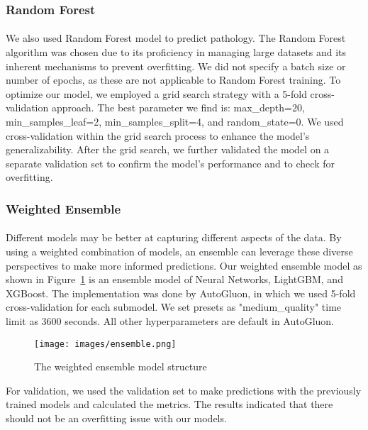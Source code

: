 \documentclass{article}
\begin{document}
\subsubsection{Random Forest}
\paragraph{ }
We also used Random Forest model to predict pathology. The Random Forest algorithm was chosen due to its proficiency in managing large datasets and its inherent mechanisms to prevent overfitting. We did not specify a batch size or number of epochs, as these are not applicable to Random Forest training. To optimize our model, we employed a grid search strategy with a 5-fold cross-validation approach. The best parameter we find is: max\_depth=20, min\_samples\_leaf=2, min\_samples\_split=4, and random\_state=0. We used cross-validation within the grid search process to enhance the model's generalizability. After the grid search, we further validated the model on a separate validation set to confirm the model's performance and to check for overfitting.

\subsubsection{Weighted Ensemble}
\paragraph{ }
Different models may be better at capturing different aspects of the data. By using a weighted combination of models, an ensemble can leverage these diverse perspectives to make more informed predictions. Our weighted ensemble model as shown in Figure~\ref{fig:Figure 2} is an ensemble model of Neural Networks, LightGBM, and XGBoost. The implementation was done by AutoGluon, in which we used 5-fold cross-validation for each submodel. We set presets as "medium\_quality" time limit as 3600 seconds. All other hyperparameters are default in AutoGluon.

\begin{figure}[h]
\centering
\texttt{[image: images/ensemble.png]}
\caption{The weighted ensemble model structure}
\label{fig:Figure 2}
\end{figure}

For validation, we used the validation set to make predictions with the previously trained models and calculated the metrics. The results indicated that there should not be an overfitting issue with our models. 
\end{document}
